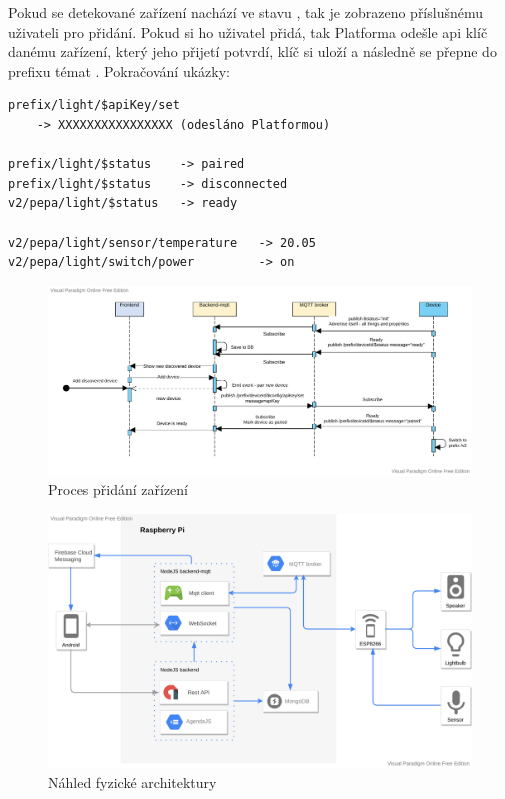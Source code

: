 Pokud se detekované zařízení nachází ve stavu , tak je zobrazeno příslušnému uživateli pro přidání. Pokud si ho uživatel přidá, tak Platforma odešle api klíč danému zařízení, který jeho přijetí potvrdí, klíč si uloží a následně se přepne do prefixu témat . Pokračování ukázky:

\begin{verbatim}
prefix/light/$apiKey/set
    -> XXXXXXXXXXXXXXXX (odesláno Platformou)

prefix/light/$status    -> paired
prefix/light/$status    -> disconnected
v2/pepa/light/$status   -> ready

v2/pepa/light/sensor/temperature   -> 20.05
v2/pepa/light/switch/power         -> on
\end{verbatim}

\begin{figure}[htbp]
    \centering
    \includegraphics[width=\textwidth]{img/pairing_communication.pdf}
    \caption{Proces přidání zařízení}
\end{figure}

\begin{figure}[htbp]
    \centering
    \includegraphics[width=\textwidth]{img/architecture.pdf}
    \caption{Náhled fyzické architektury}
\end{figure}

